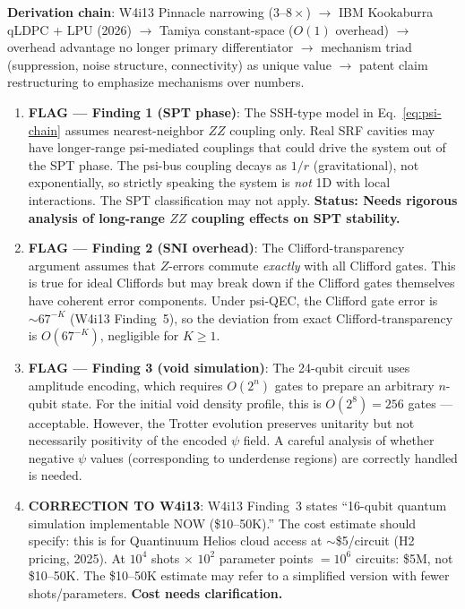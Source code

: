 \documentclass[11pt]{article}
\theoremstyle{definition}
\theoremstyle{remark}
\begin{document}
\begin{tcolorbox}[colback=blue!5!white, colframe=blue!60!black,
  title=\textbf{W4i14 TOP 5 FINDINGS --- READ FIRST}]
\begin{enumerate}[nosep]
  \textbf{Derivation chain}: W4i13 Pinnacle narrowing ($3$--$8\times$)
  $\to$ IBM Kookaburra qLDPC + LPU (2026)
  $\to$ Tamiya constant-space ($O(1)$ overhead)
  $\to$ overhead advantage no longer primary differentiator
  $\to$ mechanism triad (suppression, noise structure, connectivity)
  as unique value
  $\to$ patent claim restructuring to emphasize mechanisms over numbers.

\end{enumerate}
\end{tcolorbox}

\begin{tcolorbox}[colback=red!5!white, colframe=red!60!black,
  title=\textbf{INCONSISTENCIES AND FLAGS}]
\begin{enumerate}[nosep]

\item \textbf{FLAG --- Finding 1 (SPT phase)}: The SSH-type model in
  Eq.~\eqref{eq:psi-chain} assumes nearest-neighbor $ZZ$ coupling only.
  Real SRF cavities may have longer-range psi-mediated couplings that
  could drive the system out of the SPT phase.  The psi-bus coupling
  decays as $1/r$ (gravitational), not exponentially, so strictly speaking
  the system is \emph{not} 1D with local interactions.  The SPT
  classification may not apply.  \textbf{Status: Needs rigorous analysis
  of long-range $ZZ$ coupling effects on SPT stability.}

\item \textbf{FLAG --- Finding 2 (SNI overhead)}: The Clifford-transparency
  argument assumes that $Z$-errors commute \emph{exactly} with all Clifford
  gates.  This is true for ideal Cliffords but may break down if the
  Clifford gates themselves have coherent error components.  Under psi-QEC,
  the Clifford gate error is $\sim 67^{-K}$ (W4i13 Finding~5), so the
  deviation from exact Clifford-transparency is $O(67^{-K})$, negligible
  for $K \geq 1$.

\item \textbf{FLAG --- Finding 3 (void simulation)}: The 24-qubit circuit
  uses amplitude encoding, which requires $O(2^n)$ gates to prepare an
  arbitrary $n$-qubit state.  For the initial void density profile,
  this is $O(2^8) = 256$ gates --- acceptable.  However, the Trotter
  evolution preserves unitarity but not necessarily positivity of the
  encoded $\psi$ field.  A careful analysis of whether negative $\psi$
  values (corresponding to underdense regions) are correctly handled is
  needed.

\item \textbf{CORRECTION TO W4i13}: W4i13 Finding~3 states
  ``16-qubit quantum simulation implementable NOW (\$10--50K).''
  The cost estimate should specify: this is for Quantinuum Helios cloud
  access at $\sim$\$5/circuit (H2 pricing, 2025).  At $10^4$ shots
  $\times$ $10^2$ parameter points $= 10^6$ circuits: \$5M, not \$10--50K.
  The \$10--50K estimate may refer to a simplified version with fewer
  shots/parameters.  \textbf{Cost needs clarification.}


\end{enumerate}
\end{tcolorbox}
\end{document}
